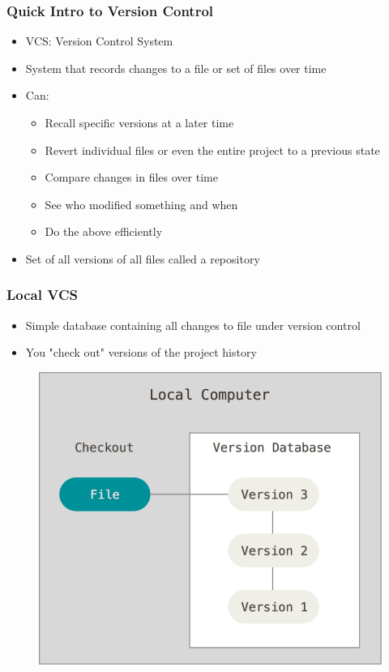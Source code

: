 \documentclass{beamer}
\begin{document}
\begin{frame}
	\frametitle{Quick Intro to Version Control}
	\begin{itemize}
		\item{VCS: Version Control System}
		\item{System that records changes to a file or set of files over time}
		\item{Can:}
		\begin{itemize}
			\item{Recall specific versions at a later time}
			\item{Revert individual files or even the entire project to a previous state}
			\item{Compare changes in files over time}
			\item{See who modified something and when}
			\item{Do the above efficiently}
		\end{itemize}
		\item{Set of all versions of all files called a repository}
	\end{itemize}
\end{frame}

\begin{frame}
	\frametitle{Local VCS}
	\begin{itemize}
		\item{Simple database containing all changes to file under version control}
		\item{You "check out" versions of the project history}
	\end{itemize}
	\begin{figure}
		\includegraphics[scale=0.25]{Local_VCS-0.png}
	\end{figure}
\end{frame}
\end{document}
